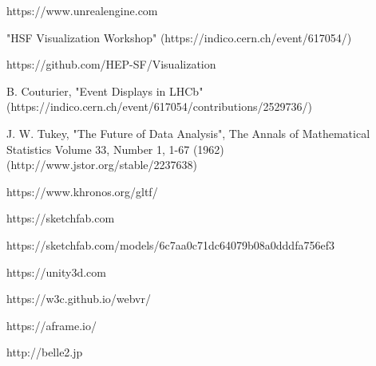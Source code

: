 \documentclass[12pt,a4paper]{article}
\begin{document}
\begin{thebibliography}{999}
 https://www.unrealengine.com


 "HSF Visualization Workshop" (https://indico.cern.ch/event/617054/)

 https://github.com/HEP-SF/Visualization



 B. Couturier, "Event Displays in LHCb" (https://indico.cern.ch/event/617054/contributions/2529736/)

 J. W. Tukey, "The Future of Data Analysis", The Annals of Mathematical Statistics Volume 33, Number 1, 1-67 (1962) (http://www.jstor.org/stable/2237638)

 https://www.khronos.org/gltf/

 https://sketchfab.com

 https://sketchfab.com/models/6c7aa0c71dc64079b08a0dddfa756ef3

 https://unity3d.com

 https://w3c.github.io/webvr/

 https://aframe.io/

 http://belle2.jp

\end{thebibliography}

\sloppy
\raggedright
\clearpage
\end{document}
